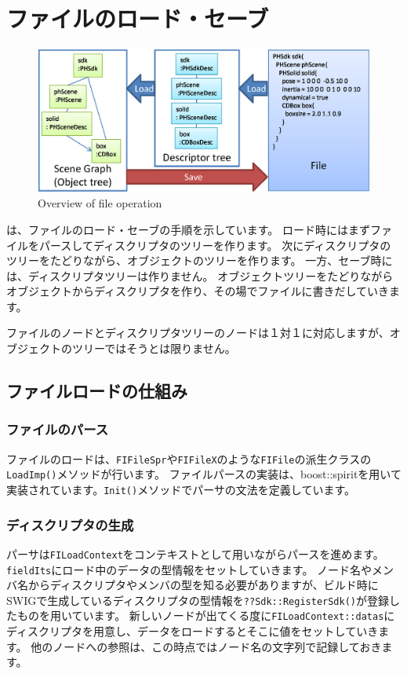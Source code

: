 \section{\KLUDGE ファイルのロード・セーブ}
\begin{figure}
\begin{center}
\includegraphics*[width=.95\hsize]{fig/fileOperation.eps}
\end{center}
\caption{Overview of file operation}
\label{fig_fileOperation}
\end{figure}

\KLUDGE は、ファイルのロード・セーブの手順を示しています。
\KLUDGE ロード時にはまずファイルをパースしてディスクリプタのツリーを作ります。
\KLUDGE 次にディスクリプタのツリーをたどりながら、オブジェクトのツリーを作ります。
\KLUDGE 一方、セーブ時には、ディスクリプタツリーは作りません。
\KLUDGE オブジェクトツリーをたどりながらオブジェクトからディスクリプタを作り、その場でファイルに書きだしていきます。

\KLUDGE ファイルのノードとディスクリプタツリーのノードは１対１に対応しますが、オブジェクトのツリーではそうとは限りません。

\subsection{\KLUDGE ファイルロードの仕組み}
\subsubsection{\KLUDGE ファイルのパース}
\KLUDGE ファイルのロードは、\texttt{FIFileSpr}\KLUDGE や\texttt{FIFileX}\KLUDGE のような\texttt{FIFile}\KLUDGE の派生クラスの\texttt{LoadImp()}\KLUDGE メソッドが行います。
\KLUDGE ファイルパースの実装は、boost::spirit\KLUDGE を用いて実装されています。\texttt{Init()}\KLUDGE メソッドでパーサの文法を定義しています。
\subsubsection{\KLUDGE ディスクリプタの生成}
\KLUDGE パーサは\texttt{FILoadContext}\KLUDGE をコンテキストとして用いながらパースを進めます。
\texttt{fieldIts}\KLUDGE にロード中のデータの型情報をセットしていきます。
\KLUDGE ノード名やメンバ名からディスクリプタやメンバの型を知る必要がありますが、ビルド時にSWIG\KLUDGE で生成しているディスクリプタの型情報を\texttt{??Sdk::RegisterSdk()}\KLUDGE が登録したものを用いています。
\KLUDGE 新しいノードが出てくる度に\texttt{FILoadContext::datas}\KLUDGE にディスクリプタを用意し、データをロードするとそこに値をセットしていきます。
\KLUDGE 他のノードへの参照は、この時点ではノード名の文字列で記録しておきます。
